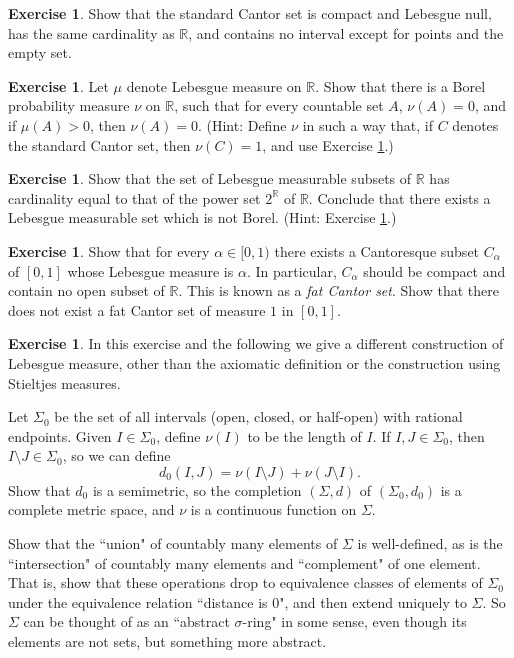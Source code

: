 \documentclass[12pt]{book}
\newcommand{\RR}{\mathbb{R}}
\newcommand{\dfn}[1]{\emph{#1}\index{#1}}
\theoremstyle{definition}
\newtheorem{exercise}[theorem]{Exercise}
\begin{document}
\begin{exercise}
\label{Cantor set props}
Show that the standard Cantor set is compact and Lebesgue null, has the same cardinality as $\RR$, and contains no interval except for points and the empty set.
\end{exercise}

\begin{exercise}
Let $\mu$ denote Lebesgue measure on $\RR$.
Show that there is a Borel probability measure $\nu$ on $\RR$, such that for every countable set $A$, $\nu(A) = 0$, and if $\mu(A) > 0$, then $\nu(A) = 0$.
(Hint: Define $\nu$ in such a way that, if $C$ denotes the standard Cantor set, then $\nu(C) = 1$, and use Exercise \ref{Cantor set props}.)
\end{exercise}

\begin{exercise}
Show that the set of Lebesgue measurable subsets of $\RR$ has cardinality equal to that of the power set $2^\RR$ of $\RR$. Conclude that there exists a Lebesgue measurable set which is not Borel.
(Hint: Exercise \ref{Cantor set props}.)
\end{exercise}

\begin{exercise}
\label{fat cat}
Show that for every $\alpha \in [0, 1)$ there exists a Cantoresque subset $C_\alpha$ of $[0, 1]$ whose Lebesgue measure is $\alpha$.
In particular, $C_\alpha$ should be compact and contain no open subset of $\RR$.
This is known as a \dfn{fat Cantor set}.
Show that there does not exist a fat Cantor set of measure $1$ in $[0, 1]$.
\end{exercise}

\begin{exercise}
\label{physical lebesgue measure 1}
In this exercise and the following we give a different construction of Lebesgue measure, other than the axiomatic definition or the construction using Stieltjes measures.

Let $\Sigma_0$ be the set of all intervals (open, closed, or half-open) with rational endpoints.
Given $I \in \Sigma_0$, define $\nu(I)$ to be the length of $I$.
If $I, J \in \Sigma_0$, then $I \setminus J \in \Sigma_0$, so we can define
$$d_0(I, J) = \nu(I \setminus J) + \nu(J \setminus I).$$
Show that $d_0$ is a semimetric, so the completion $(\Sigma, d)$ of $(\Sigma_0, d_0)$ is a complete metric space, and $\nu$ is a continuous function on $\Sigma$.

Show that the ``union" of countably many elements of $\Sigma$ is well-defined, as is the ``intersection" of countably many elements and ``complement" of one element.
That is, show that these operations drop to equivalence classes of elements of $\Sigma_0$ under the equivalence relation ``distance is $0$", and then extend uniquely to $\Sigma$.
So $\Sigma$ can be thought of as an ``abstract $\sigma$-ring" in some sense, even though its elements are not sets, but something more abstract.
\end{exercise}
\end{document}
